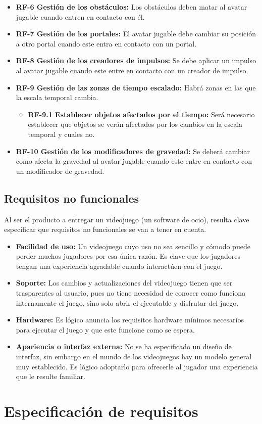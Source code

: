 \begin{itemize}
\item
\textbf{RF-6 Gestión de los obstáculos:} Los obstáculos deben matar al avatar jugable cuando entren en contacto con él.

\item
\textbf{RF-7 Gestión de los portales:} El avatar jugable debe cambiar su posición a otro portal cuando este entra en contacto con un portal.

\item
\textbf{RF-8 Gestión de los creadores de impulsos:} Se debe aplicar un impulso al avatar jugable cuando este entre en contacto con un creador de impulso.

\item
\textbf{RF-9 Gestión de las zonas de tiempo escalado:} Habrá zonas en las que la escala temporal cambia.

\begin{itemize}
\item
\textbf{RF-9.1 Establecer objetos afectados por el tiempo:} Será necesario establecer que objetos se verán afectados por los cambios en la escala temporal y cuales no.
\end{itemize}

\item
\textbf{RF-10 Gestión de los modificadores de gravedad:} Se deberá cambiar como afecta la gravedad al avatar jugable cuando este entre en contacto con un modificador de gravedad.
\end{itemize}

\subsection{Requisitos no funcionales}
Al ser el producto a entregar un videojuego (un software de ocio), resulta clave especificar que requisitos no funcionales se van a tener en cuenta.

\begin{itemize}
\item
\textbf{Facilidad de uso:} Un videojuego cuyo uso no sea sencillo y cómodo puede perder muchos jugadores por esa única razón. Es clave que los jugadores tengan una experiencia agradable cuando interactúen con el juego.

\item
\textbf{Soporte:} Los cambios y actualizaciones del videojuego tienen que ser trasparentes al usuario, pues no tiene necesidad de conocer como funciona internamente el juego, sino solo abrir el ejecutable y disfrutar del juego.

\item
\textbf{Hardware:} Es lógico anuncia los requisitos hardware mínimos necesarios para ejecutar el juego y que este funcione como se espera.

\item
\textbf{Apariencia o interfaz externa:} No se ha especificado un diseño de interfaz, sin embargo en el mundo de los videojuegos hay un modelo general muy establecido. Es lógico adoptarlo para ofrecerle al jugador una experiencia que le resulte familiar.
\end{itemize}


\section{Especificación de requisitos}


